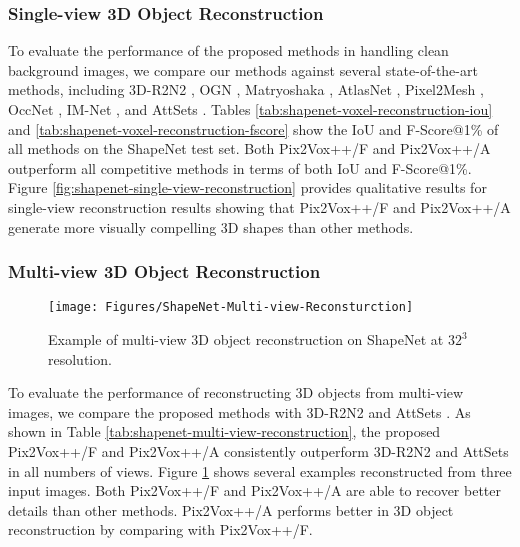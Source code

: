 \documentclass[twocolumn]{svjour3}
\begin{document}
\subsubsection{Single-view 3D Object Reconstruction}

To evaluate the performance of the proposed methods in handling clean background images, we compare our methods against several state-of-the-art methods, including 3D-R2N2 \citep{DBLP:conf/eccv/ChoyXGCS16}, OGN \citep{DBLP:conf/iccv/TatarchenkoDB17}, Matryoshaka \citep{DBLP:conf/cvpr/Richter018}, AtlasNet \citep{DBLP:conf/cvpr/GroueixFKRA18}, Pixel2Mesh \citep{DBLP:conf/eccv/WangZLFLJ18}, OccNet \citep{DBLP:conf/cvpr/MeschederONNG19}, IM-Net \citep{DBLP:conf/cvpr/ChenZ19}, and AttSets \citep{DBLP:journals/ijcv/YangSAN19}.
Tables \ref{tab:shapenet-voxel-reconstruction-iou} and \ref{tab:shapenet-voxel-reconstruction-fscore} show the IoU and F-Score@1\% of all methods on the ShapeNet test set.
Both Pix2Vox++/F and Pix2Vox++/A outperform all competitive methods in terms of both IoU and F-Score@1\%.
Figure \ref{fig:shapenet-single-view-reconstruction} provides qualitative results for single-view reconstruction results showing that Pix2Vox++/F and Pix2Vox++/A generate more visually compelling 3D shapes than other methods.

\subsubsection{Multi-view 3D Object Reconstruction}

\begin{figure}
  \centering
  \resizebox{\linewidth}{!} {
    \texttt{[image: Figures/ShapeNet-Multi-view-Reconsturction]}
  }
  \caption{Example of multi-view 3D object reconstruction on ShapeNet at $32^3$ resolution.}
  \label{fig:shapenet-multi-view-reconstruction}
\end{figure}

To evaluate the performance of reconstructing 3D objects from multi-view images, we compare the proposed methods with 3D-R2N2 \citep{DBLP:conf/eccv/ChoyXGCS16} and AttSets \citep{DBLP:journals/ijcv/YangSAN19}.
As shown in Table \ref{tab:shapenet-multi-view-reconstruction}, the proposed Pix2Vox++/F and Pix2Vox++/A consistently outperform 3D-R2N2 and AttSets in all numbers of views.
Figure \ref{fig:shapenet-multi-view-reconstruction} shows several examples reconstructed from three input images.
Both Pix2Vox++/F and Pix2Vox++/A are able to recover better details than other methods.
Pix2Vox++/A performs better in 3D object reconstruction by comparing with Pix2Vox++/F. 
\end{document}
